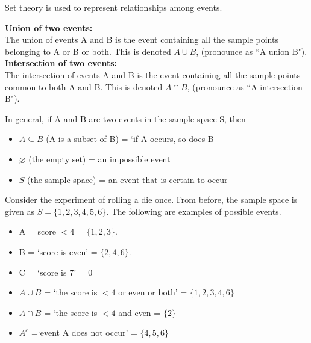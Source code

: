 \documentclass[12pt]{report}
\begin{document}
{ \Large
	
	Set theory is used to represent relationships among events.\\ \bigskip
	
	\noindent \textbf{Union of two events:}\\
	The union of events A and B is the event containing all the sample points
	belonging to A or B or both. This is denoted $A\cup B$, (pronounce as ``A union
	B").\\ \bigskip
	\noindent \textbf{Intersection of two events:}\\
	The intersection of events A and B is the event containing all the sample
	points common to both A and B. This is denoted $A\cap B$, (pronounce as ``A intersection
	B").
}

{ \Large
	
	In general, if A and B are two events in the sample space S, then
	\begin{itemize} 
		\item $A \subseteq B$ (A is a subset of B) = `if A occurs, so does B
		\item $\varnothing$ (the empty set) = an impossible event
		\item $S$ (the sample space) = an event that is certain to occur
	\end{itemize}
}

{ \Large
	
	Consider the experiment of rolling a die once. From before, the sample space
	is given as $S = \{ 1,2,3,4,5,6\}$. The following are examples of possible events.
	\begin{itemize} 
		\item A = score $< 4$ = $\{ 1,2,3\}$.
		\item B = `score is even' = $\{ 2,4,6\}$.
		\item C = `score is 7' = 0
		\item $A\cup B$ = `the score is $< 4$  or even or both' = $\{ 1,2,3,4,6\}$
		\item $A\cap B$ = `the score is $< 4$  and even = $ \{ 2 \}$
		\item $A^c$ =`event A does not occur' = $ \{ 4,5,6\}$
	\end{itemize}
}
\end{document}
